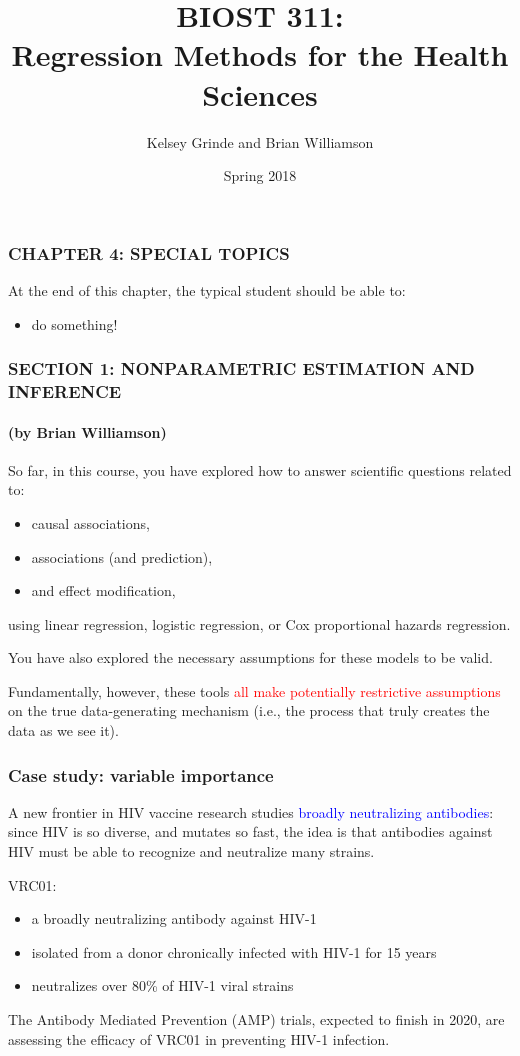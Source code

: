\documentclass[12pt, 
hyperref={colorlinks=true, linkcolor=blue, urlcolor=cyan}]{beamer}
\title{BIOST 311: \\ Regression Methods for the Health Sciences}
\author{Kelsey Grinde and Brian Williamson}
\institute{UW Biostatistics}
\date{Spring 2018}
\begin{document}
\begin{frame}
\titlepage\thispagestyle{empty}
\end{frame}

  
\setcounter{framenumber}{\value{chap1}}

\begin{frame}
\frametitle{CHAPTER 4: SPECIAL TOPICS}
At the end of this chapter, the typical student should be able to:
\begin{itemize}
\item do something!
\end{itemize}
\end{frame}

\begin{frame}
\frametitle{SECTION 1: {\small NONPARAMETRIC ESTIMATION AND INFERENCE}}
\framesubtitle{(by Brian Williamson)}

So far, in this course, you have explored how to answer scientific questions related to: \vspace{-0.3cm}
\begin{itemize}
\item causal associations,
\item associations (and prediction),
\item and effect modification,
\end{itemize} \vspace{-0.3cm}
using linear regression, logistic regression, or Cox proportional hazards regression.

You have also explored the necessary assumptions for these models to be valid.

Fundamentally, however, these tools \textcolor{red}{all make potentially restrictive assumptions} on the true data-generating mechanism (i.e., the process that truly creates the data as we see it).
\end{frame}

\begin{frame}
\frametitle{Case study: variable importance}
A new frontier in HIV vaccine research studies \textcolor{blue}{broadly neutralizing antibodies}: since HIV is so diverse, and mutates so fast, the idea is that antibodies against HIV must be able to recognize and neutralize many strains.

VRC01: \vspace{-0.3cm}
\begin{itemize}
\item a broadly neutralizing antibody against HIV-1
\item isolated from a donor chronically infected with HIV-1 for 15 years
\item neutralizes over 80\% of HIV-1 viral strains 
\end{itemize}

The Antibody Mediated Prevention (AMP) trials, expected to finish in 2020, are assessing the efficacy of VRC01 in preventing HIV-1 infection.
\end{frame}
\end{document}
